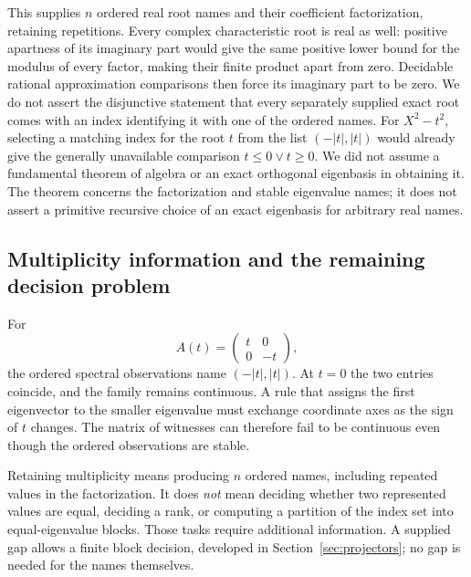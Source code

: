 This supplies $n$ ordered real root names and their coefficient factorization, retaining repetitions. Every complex characteristic root is real as well: positive apartness of its imaginary part would give the same positive lower bound for the modulus of every factor, making their finite product apart from zero. Decidable rational approximation comparisons then force its imaginary part to be zero. We do not assert the disjunctive statement that every separately supplied exact root comes with an index identifying it with one of the ordered names. For $X^2-t^2$, selecting a matching index for the root $t$ from the list $(-|t|,|t|)$ would already give the generally unavailable comparison $t\le0\lor t\ge0$. We did not assume a fundamental theorem of algebra or an exact orthogonal eigenbasis in obtaining it. The theorem concerns the factorization and stable eigenvalue names; it does not assert a primitive recursive choice of an exact eigenbasis for arbitrary real names.

\subsection{Multiplicity information and the remaining decision problem}

For
\[
 A(t)=\begin{pmatrix}t&0\\0&-t\end{pmatrix},
\]
the ordered spectral observations name $(-|t|,|t|)$. At $t=0$ the two entries coincide, and the family remains continuous. A rule that assigns the first eigenvector to the smaller eigenvalue must exchange coordinate axes as the sign of $t$ changes. The matrix of witnesses can therefore fail to be continuous even though the ordered observations are stable.

Retaining multiplicity means producing $n$ ordered names, including repeated values in the factorization. It does \emph{not} mean deciding whether two represented values are equal, deciding a rank, or computing a partition of the index set into equal-eigenvalue blocks. Those tasks require additional information. A supplied gap allows a finite block decision, developed in Section~\ref{sec:projectors}; no gap is needed for the names themselves.
